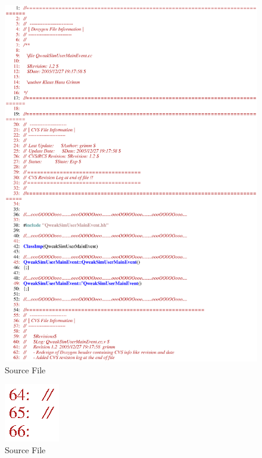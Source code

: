 \clearpage

\begin{figure}[h]
  \hspace{0cm}
  \includegraphics[scale=0.8]{./figures13/QweakSimUserMainEvent.cc-p1.eps}
  \caption{Source File}
           \label{fig:XIII-SC-9}
\end{figure}

\clearpage

\begin{figure}[h]
  \hspace{0cm}
  \includegraphics[scale=0.8]{./figures13/QweakSimUserMainEvent.cc-p2.eps}
  \caption{Source File}
           \label{fig:XIII-SC-10}
\end{figure}

